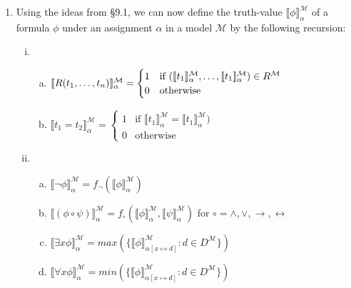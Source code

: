 	\begin{enumerate}[\thesection.1]
			
		\item Using the ideas from \S9.1, we can now define the truth-value $\llbracket\phi\rrbracket^\mathcal{M}_\alpha$ of a formula $\phi$ under an assignment $\alpha$ in a model $\mathcal{M}$ by the following recursion:
		
		\begin{enumerate}[(i)]
			
				\item		\begin{enumerate}[(a)]

					\item $\llbracket R(t_1,\mathellipsis, t_n)\rrbracket_\alpha^\mathcal{M}=\begin{cases} 1 & \text{if }(\llbracket t_1\rrbracket^\mathcal{M}_\alpha,\mathellipsis, \llbracket t_1\rrbracket^\mathcal{M}_\alpha)\in R^\mathcal{M}\\0 &\text{otherwise}\end{cases}$
					\item $\llbracket t_1=t_2\rrbracket_\alpha^\mathcal{M}=\begin{cases} 1 & \text{if }\llbracket t_1\rrbracket^\mathcal{M}_\alpha=\llbracket t_1\rrbracket^\mathcal{M}_\alpha)\\0 &\text{otherwise}\end{cases}$				
				\end{enumerate}
				
				\item \begin{enumerate}[(a)]

					\item  $\llbracket\neg \phi\rrbracket^\mathcal{M}_\alpha=f_\neg(\llbracket\phi\rrbracket^\mathcal{M}_\alpha)$
				
				\item  $\llbracket(\phi\circ \psi)\rrbracket^\mathcal{M}_\alpha=f_\circ( \llbracket\phi\rrbracket^\mathcal{M}_\alpha, \llbracket\psi\rrbracket^\mathcal{M}_\alpha)$ for $\circ=\land,\lor,\to,\leftrightarrow$
				
				\item $\llbracket\exists x\phi\rrbracket_\alpha^\mathcal{M}=max(\{\llbracket \phi\rrbracket^\mathcal{M}_{\alpha[x\mapsto d]}: d\in D^\mathcal{M}\})$
				
				\item[] $\llbracket\forall x\phi\rrbracket_\alpha^\mathcal{M}=min(\{\llbracket \phi\rrbracket^\mathcal{M}_{\alpha[x\mapsto d]}: d\in D^\mathcal{M}\})$
								

\end{enumerate}
\end{enumerate}
\end{enumerate}
